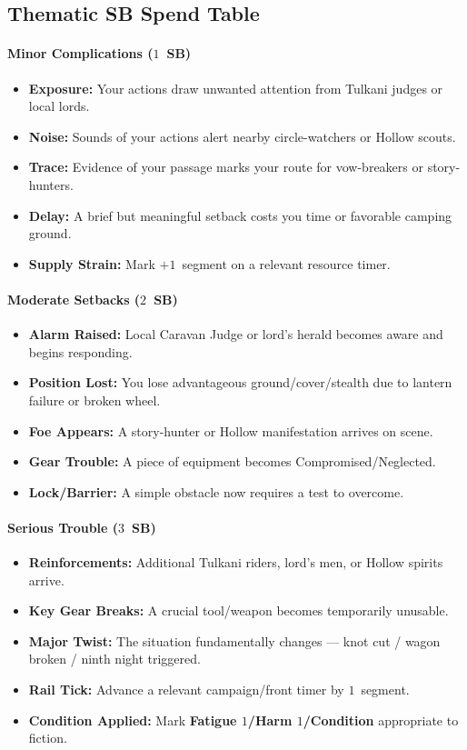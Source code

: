 \subsection*{Thematic SB Spend Table}
\label{sec:tulkani-sb}

\paragraph{Minor Complications ($1$~SB)}
\begin{itemize}
\item \textbf{Exposure:} Your actions draw unwanted attention from Tulkani judges or local lords.
\item \textbf{Noise:} Sounds of your actions alert nearby circle-watchers or Hollow scouts.
\item \textbf{Trace:} Evidence of your passage marks your route for vow-breakers or story-hunters.
\item \textbf{Delay:} A brief but meaningful setback costs you time or favorable camping ground.
\item \textbf{Supply Strain:} Mark $+1$~segment on a relevant resource timer.
\end{itemize}

\paragraph{Moderate Setbacks ($2$~SB)}
\begin{itemize}
\item \textbf{Alarm Raised:} Local Caravan Judge or lord's herald becomes aware and begins responding.
\item \textbf{Position Lost:} You lose advantageous ground/cover/stealth due to lantern failure or broken wheel.
\item \textbf{Foe Appears:} A story-hunter or Hollow manifestation arrives on scene.
\item \textbf{Gear Trouble:} A piece of equipment becomes Compromised/Neglected.
\item \textbf{Lock/Barrier:} A simple obstacle now requires a test to overcome.
\end{itemize}

\paragraph{Serious Trouble ($3$~SB)}
\begin{itemize}
\item \textbf{Reinforcements:} Additional Tulkani riders, lord's men, or Hollow spirits arrive.
\item \textbf{Key Gear Breaks:} A crucial tool/weapon becomes temporarily unusable.
\item \textbf{Major Twist:} The situation fundamentally changes --- knot cut / wagon broken / ninth night triggered.
\item \textbf{Rail Tick:} Advance a relevant campaign/front timer by $1$~segment.
\item \textbf{Condition Applied:} Mark \textbf{Fatigue $1$/Harm $1$/Condition} appropriate to fiction.
\end{itemize}

